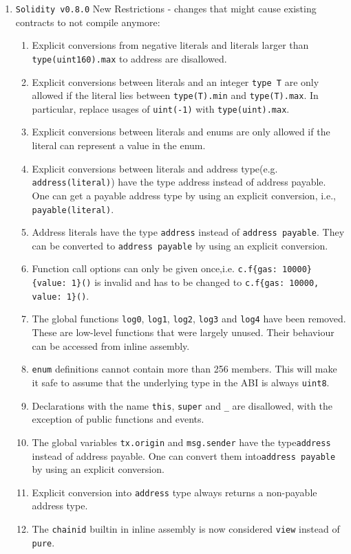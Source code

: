\begin{enumerate}
\item \verb|Solidity v0.8.0| New Restrictions - changes that might cause existing contracts to not compile anymore:
    \begin{enumerate}
	\item Explicit conversions from negative literals and literals larger than \verb|type(uint160).max| to address are disallowed.
	\item Explicit conversions between literals and an integer \verb|type T| are only allowed if the literal lies between \verb|type(T).min| and \verb|type(T).max|. In particular, replace usages of \verb|uint(-1)| with \verb|type(uint).max|.
	\item Explicit conversions between literals and enums are only allowed if the literal can represent a value in the enum.
	\item Explicit conversions between literals and address type\linebreak (e.g. \verb|address(literal)|) have the type address instead of address payable. One can get a payable address type by using an explicit conversion, i.e., \verb|payable(literal)|.
	\item Address literals have the type \verb|address| instead of \verb|address payable|. They can be converted to \verb|address payable| by using an explicit conversion.
	\item Function call options can only be given once,\linebreak i.e. \verb|c.f{gas: 10000}{value: 1}()| is invalid and has to be changed to \verb|c.f{gas: 10000, value: 1}()|.
	\item The global functions \verb|log0|, \verb|log1|, \verb|log2|, \verb|log3| and \verb|log4| have been removed. These are low-level functions that were largely unused. Their behaviour can be accessed from inline assembly.
	\item\verb|enum| definitions cannot contain more than 256 members. This will make it safe to assume that the underlying type in the ABI is always \verb|uint8|.
	\item Declarations with the name \verb|this|, \verb|super| and \verb|_| are disallowed, with the exception of public functions and events.
	\item The global variables \verb|tx.origin| and \verb|msg.sender| have the type\linebreak\verb|address| instead of address payable. One can convert them into\linebreak\verb|address payable| by using an explicit conversion.
	\item Explicit conversion into \verb|address| type always returns a non-payable address type.
	\item The \verb|chainid| builtin in inline assembly is now considered \verb|view| instead of \verb|pure|.
    \end{enumerate}


\end{enumerate}
